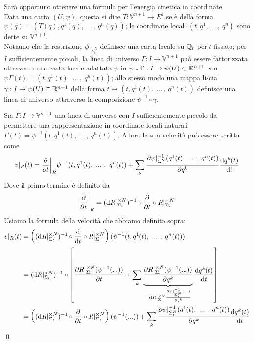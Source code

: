 \documentclass[openany]{book}
\renewcommand\V{\mathbb{V}}
\begin{document}
Sarà opportuno ottenere una formula per l'energia cinetica in coordinate.\\
Data una carta $(U,\psi)$, questa si dice  $T:\V^{n+1}\to E^1$ se è della forma $\psi(q) = (T(q),q^1(q),\ ...\ ,\ q^n(q))$; le coordinate locali $(t,q^1,\ ...\ ,\ q^n)$ sono dette  su $\V^{n+1}$.\\
Notiamo che la restrizione $\phi|_{\Sigma_t^N}$ definisce una carta locale su $\mathbb{Q}_t$ per $t$ fissato; per $I$ sufficientemente piccoli, la linea di universo $\Gamma : I\to\V^{n+1}$ può essere fattorizzata attraverso una carta locale adattata $\psi$ in $\psi\circ\Gamma : I \to \psi(U)\subset \mathbb{R}^{n+1}$ con $\psi\Gamma(t) = (t,q^1(t),\ ...\ ,\ q^n(t))$; allo stesso modo una mappa liscia $\gamma:I\to\psi(U)\subset\mathbb{R}^{n+1}$ della forma $t\mapsto(t,q^1(t),\ ...\ ,\ q^n(t))$ definisce una linea di universo attraverso la composizione $\psi^{-1}\circ\gamma$.

\begin{lemma}{}{}
    Sia $\Gamma:I\to\V^{n+1}$ una linea di universo con $I$ sufficientemente piccolo da permettere una rappresentazione in coordinate locali naturali $\Gamma(t) = \psi^{-1}(t,q^1(t),\ ...\ ,\ q^n(t))$. Allora la sua velocità può essere scritta come 
    \[ v|_R(t) = \frac{\partial }{\partial t}\bigg|_R \psi^{-1}(t, q^1(t),\ ...\ ,\ q^n(t)) +\sum_k \frac{\partial \psi|_{\Sigma_t^N}^{-1}(q^1(t),\ ...\ ,\ q^n(t))}{\partial q^k}\frac{\text{d} q^k(t)}{\text{d} t} \]
    Dove il primo termine è definito da 
    \[ \frac{\partial }{\partial t}\bigg|_R = (\text{d} R|_{\Sigma_t}^{\times N})^{-1}\circ \frac{\partial}{\partial t}\circ R|_{\Sigma_t}^{\times N} \]
    \proof 
    Usiamo la formula della velocità che abbiamo definito sopra:
    \begin{align*}
        v|_R(t) & = \left((\text{d} R|_{\Sigma_t}^{\times N})^{-1}\circ \frac{\text{d}}{\text{d} t} \circ R|_{\Sigma_t}^{\times N} \right)(\psi^{-1}(t,q^1(t),\ ...\ ,\ q^n(t))) \\ & = (\text{d} R|_{\Sigma_t}^{\times N})^{-1}\circ\left[ \frac{\partial R|_{\Sigma_t}^{\times N}(\psi^{-1}(...))}{\partial t} + \sum_k \underbrace{\frac{\partial R|_{\Sigma_t}^{\times N}(\psi^{-1}(...))}{\partial q^k}}_{= \text{d} R|_{\Sigma_t}^{\times N} \frac{\partial \psi|_{\Sigma_t^N}^{-1}(...)}{\partial q^k}}\frac{\text{d} q^k(t)}{\text{d} t} \right] \\ & = \left((\text{d} R|_{\Sigma_t}^{\times N})^{-1}\circ \frac{\partial}{\partial t}\circ R|_{\Sigma_t}^{\times N}\right)(\psi^{-1}(...)) + \sum_k \frac{\partial \psi|_{\Sigma_t^N}^{-1}(q^1(t),\ ...\ ,\ q^n(t))}{\partial q^k}\frac{\text{d} q^k(t)}{\text{d} t}
    \end{align*}
    \qed 
\end{lemma}
\end{document}
